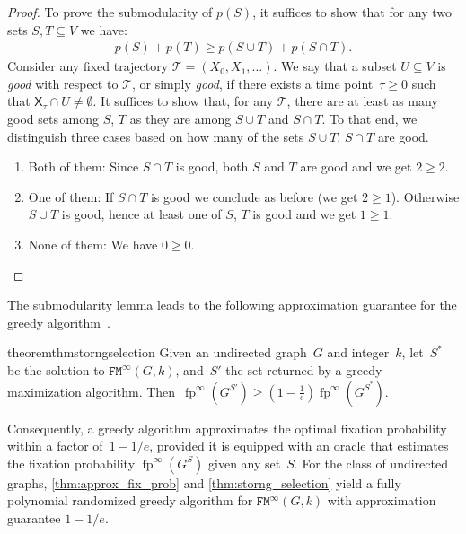 \documentclass[letterpaper]{article}
\newcommand{\X}{\mathsf{X}}
\newcommand{\fp}{\operatorname{fp}}
\newcommand{\Traj}{\mathcal{T}}
\newcommand{\NodeActivationMoranStrong}{\texttt{FM}^{\infty}}
\begin{document}
\begin{proof}
To prove the submodularity of $p(S)$, it suffices to show that for any two sets $S,T\subseteq V$ we have:
\begin{align}
p(S)+p(T)\ge p(S\cup T) + p(S\cap T).
\end{align}
Consider any fixed trajectory $\Traj = (X_0,X_1,\dots)$.
We say that a subset $U\subseteq V$ is \emph{good} with respect to $\Traj$, or simply \emph{good}, if there exists a time point~$\tau\ge 0$ such that $\X_{\tau}\cap U\ne\emptyset$. It suffices to show that, for any $\Traj$, there are at least as many good sets among $S$, $T$ as they are among $S\cup T$ and $S\cap T$. To that end, we distinguish three cases based on how many of the sets $S\cup T$, $S\cap T$ are good.
\begin{enumerate}
\item Both of them: Since $S\cap T$ is good, both $S$ and $T$ are good and we get $2\ge 2$.
\item One of them: If $S\cap T$ is good we conclude as before (we get $2\ge 1$).
Otherwise $S\cup T$ is good, hence at least one of $S$, $T$ is good and we get $1\ge 1$.
\item None of them: We have $0\ge 0$. \qedhere
\end{enumerate}
\end{proof}

The submodularity lemma leads to the following approximation guarantee for the greedy algorithm~\cite{Nemhauser1978,Krause2014}.

\begin{restatable}{theorem}{thmstorngselection}\label{thm:storng_selection}
Given an undirected graph~$G$ and integer~$k$, let~$S^*$ be the solution to $\NodeActivationMoranStrong(G,k)$, and~$S'$ the set returned by a greedy maximization algorithm.
Then~$\fp^{\infty}(G^{S'})\geq \left(1-\frac{1}{e}\right)\fp^{\infty}(G^{S^*})$.
\end{restatable}


Consequently, a greedy algorithm approximates the optimal fixation probability within a factor of~$1-1/e$, provided it is equipped with an oracle that estimates the fixation probability $\fp^{\infty}(G^{S})$ given any set~$S$. 
For the class of undirected graphs, \cref{thm:approx_fix_prob} and \cref{thm:storng_selection} yield a fully polynomial randomized greedy algorithm for $\NodeActivationMoranStrong(G,k)$ with approximation guarantee $1-1/e$.
\end{document}
